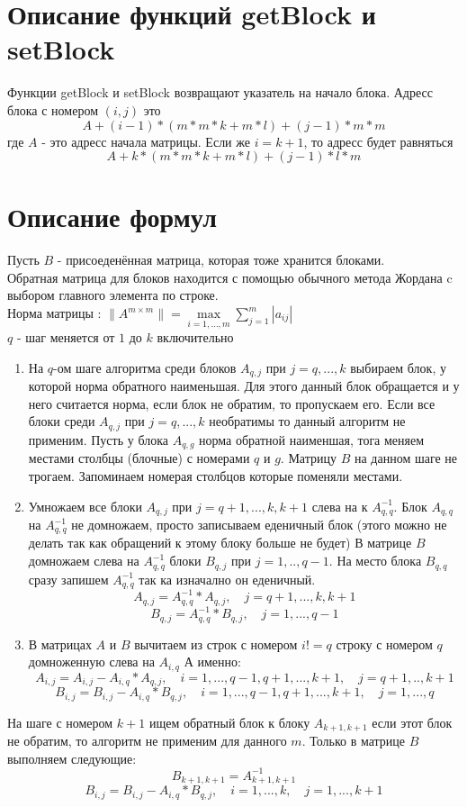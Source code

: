 \documentclass[a4paper,12pt]{article}
\begin{document}
\section{Описание функций getBlock и setBlock}
Функции getBlock и setBlock возвращают указатель на начало блока. Адресс блока с номером
$(i, j)$ это $$A + (i - 1) * (m * m * k + m * l) + (j - 1) * m * m$$ где $A$ - это адресс 
начала матрицы.
Если же $i = k + 1$, то адресс будет равняться 
$$A + k * (m * m * k + m * l) + (j - 1) * l * m$$

\section{Описание формул}
Пусть $B$ - присоеденённая матрица, которая тоже хранится блоками.\\
Обратная матрица для блоков находится с помощью обычного метода Жордана c выбором главного
элемента по строке.\\
Норма матрицы : 
$\|A^{m \times m} \| = \max\limits_{i = 1,\ldots,m} \sum\limits_{j = 1}^m |a_{ij}|$\\
$q$ - шаг меняется от $1$ до $k$ включительно

\begin{enumerate}
    \item На $q$-ом шаге алгоритма среди блоков $A_{q,j}$ при $j = q,...,k$ выбираем блок,
        у которой норма обратного наименьшая. Для этого данный блок обращается и у него
        считается норма, если блок не обратим, то пропускаем его.
        Если все блоки среди $A_{q,j}$ при $j = q,...,k$ необратимы то данный алгоритм не применим.
        Пусть у блока $A_{q, g}$ норма обратной наименшая, тога меняем местами столбцы
        (блочные) с номерами 
        $q$ и $g$. Матрицу $B$ на данном шаге не трогаем. Запоминаем номерая столбцов которые
        поменяли местами.
    \item Умножаем все блоки $A_{q, j}$ при $j = q + 1,...,k, k + 1$ слева на к $A_{q, q}^{-1}$.
        Блок $A_{q,q}$ на $A_{q, q}^{-1}$ не домножаем, просто записываем еденичный блок
        (этого можно не делать так как обращений к этому блоку больше не будет)
        В матрице $B$ домножаем слева на $A_{q, q}^{-1}$ блоки $B_{q, j}$ при 
        $j = 1,..,q-1$.
        На место блока $B_{q,q}$ сразу запишем $A_{q,q}^{-1}$ так ка изначално он еденичный.
        $$A_{q, j} = A_{q, q}^{-1} * A_{q, j}, \quad j = q + 1,...,k, k + 1$$ 
        $$B_{q, j} = A_{q, q}^{-1} * B_{q, j}, \quad j = 1,...,q-1$$ 
    \item В матрицах $A$ и $B$ вычитаем из строк с номером $i != q$ строку с номером $q$ 
        домноженную слева на $A_{i, q}$ 
        А именно: 
        $$A_{i, j} = A_{i, j} - A_{i, q} * A_{q, j}, \quad i = 1,...,q-1,q+1,...,k+1,
        \quad j = q + 1,..,k+1$$
        $$B_{i, j} = B_{i, j} - A_{i, q} * B_{q, j}, \quad i = 1,...,q-1,q+1,...,k+1,
        \quad j = 1,...,q$$
\end{enumerate}
На шаге с номером $k + 1$ ищем обратный блок к блоку $A_{k+1,k+1}$ если этот блок не обратим,
то алгоритм не применим для данного $m$. Только в матрице $B$ выполняем следующие:
$$B_{k+1,k+1} = A_{k+1,k+1}^{-1}$$
$$B_{i,j} = B_{i,j} - A_{i,q} * B_{q,j}, \quad i = 1,...,k, \quad j = 1,...,k+1$$
\end{document}
